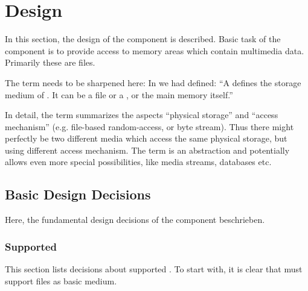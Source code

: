 
\section{\COMPmedia{} Design}
\label{sec:COMPmediaDesign}

In this section, the design of the component \COMPmedia{} is described. Basic task of the component is to provide access to memory areas which contain multimedia data. Primarily these are files.

The term \TERMmedium{} needs to be sharpened here: In  we had defined:
``A \TERMmedium{} defines the storage medium of \TERMdataBlocks{}. It can be a file or a \TERMmediaStream{}, or the main memory itself.''

In detail, the term summarizes the aspects ``physical storage'' and ``access mechanism'' (e.g. file-based random-access, or byte stream). Thus there might perfectly be two different media which access the same physical storage, but using different access mechanism. The term \TERMmedium{} is an abstraction and potentially allows even more special possibilities, like media streams, databases etc.


\subsection{Basic  Design Decisions \COMPmedia{}}
\label{sec:InterfaceDesignCOMPdataPartManagementDES2}

Here, the fundamental design decisions of the component \COMPmedia{} beschrieben.


\subsubsection{Supported \TERMmedia{}}
\label{sec:SuppMedia}

This section lists decisions about supported \TERMmedia{}. To start with, it is clear that \LibName{} must support files as basic medium.

